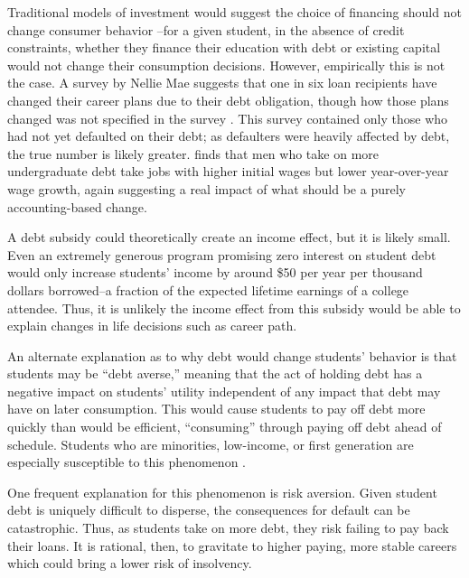 \documentclass[12pt]{article}
\begin{document}
	Traditional models of investment would suggest the choice of financing should not change consumer behavior \parencite{modigliani1958}--for a given student, in the absence of credit constraints, whether they finance their education with debt or existing capital would not change their consumption decisions. However, empirically this is not the case. A survey by Nellie Mae suggests that one in six loan recipients have changed their career plans due to their debt obligation, though how those plans changed was not specified in the survey \parencite{baum2003}. This survey contained only those who had not yet defaulted on their debt; as defaulters were heavily affected by debt, the true number is likely greater. \textcite{minicozzi2005} finds that men who take on more undergraduate debt take jobs with higher initial wages but lower year-over-year wage growth, again suggesting a real impact of what should be a purely accounting-based change. 
	
	A debt subsidy could theoretically create an income effect, but it is likely small. Even an extremely generous program promising zero interest on student debt would only increase students' income by around \$50 per year per thousand dollars borrowed--a fraction of the expected lifetime earnings of a college attendee. Thus, it is unlikely the income effect from this subsidy would be able to explain changes in life decisions such as career path.
	
	An alternate explanation as to why debt would change students' behavior is that students may be ``debt averse,'' meaning that the act of holding debt has a negative impact on students' utility independent of any impact that debt may have on later consumption. This would cause students to pay off debt more quickly than would be efficient, ``consuming'' through paying off debt ahead of schedule. Students who are minorities, low-income, or first generation are especially susceptible to this phenomenon \parencite{burdman2005, field2009, callender2005}. 
	
	One frequent explanation for this phenomenon is risk aversion. Given student debt is uniquely difficult to disperse, the consequences for default can be catastrophic. Thus, as students take on more debt, they risk failing to pay back their loans. It is rational, then, to gravitate to higher paying, more stable careers which could bring a lower risk of insolvency. 
	
\end{document}
